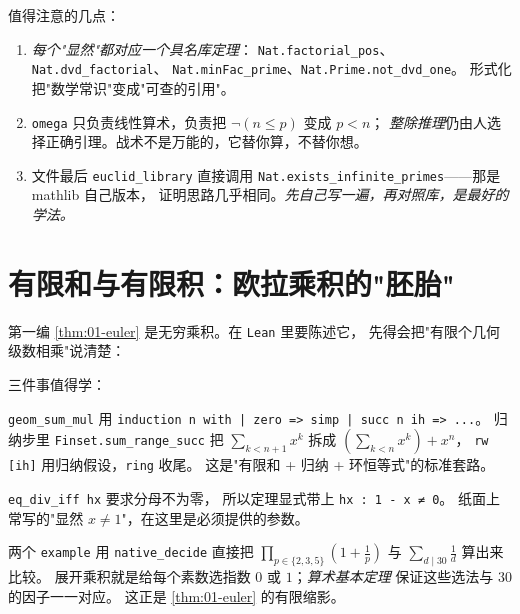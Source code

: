 值得注意的几点：

\begin{enumerate}[label=\arabic*.]
  \item \emph{每个"显然"都对应一个具名库定理}：
        \texttt{Nat.factorial\_pos}、\texttt{Nat.dvd\_factorial}、
        \texttt{Nat.minFac\_prime}、\texttt{Nat.Prime.not\_dvd\_one}。
        形式化把"数学常识"变成"可查的引用"。
  \item \texttt{omega} 只负责线性算术，负责把 $\neg(n\le p)$ 变成 $p<n$；
        \emph{整除推理}仍由人选择正确引理。战术不是万能的，它替你算，不替你想。
  \item 文件最后 \texttt{euclid\_library} 直接调用
        \texttt{Nat.exists\_infinite\_primes}——那是 mathlib 自己版本，
        证明思路几乎相同。\emph{先自己写一遍，再对照库，是最好的学法。}
\end{enumerate}

\section{有限和与有限积：欧拉乘积的"胚胎"}
\label{sec:07-eulerproduct}

第一编 \cref{thm:01-euler} 是无穷乘积。在 \texttt{Lean} 里要陈述它，
先得会把"有限个几何级数相乘"说清楚：


三件事值得学：

\begin{description}[leftmargin=2.2em]
  \item[\textbf{归纳}] \texttt{geom\_sum\_mul} 用
        \texttt{induction n with | zero => simp | succ n ih => ...}。
        归纳步里 \texttt{Finset.sum\_range\_succ} 把
        $\sum_{k<n+1}x^k$ 拆成 $\left(\sum_{k<n}x^k\right)+x^n$，
        \texttt{rw [ih]} 用归纳假设，\texttt{ring} 收尾。
        这是"有限和 + 归纳 + 环恒等式"的标准套路。
  \item[\textbf{除法条件}] \texttt{eq\_div\_iff hx} 要求分母不为零，
        所以定理显式带上 \texttt{hx : 1 - x ≠ 0}。
        纸面上常写的"显然 $x\ne1$"，在这里是必须提供的参数。
  \item[\textbf{计算验证}] 两个 \texttt{example} 用 \texttt{native\_decide}
        直接把 $\prod_{p\in\{2,3,5\}}\left(1+\frac1p\right)$
        与 $\sum_{d\mid 30}\frac1d$ 算出来比较。
        展开乘积就是给每个素数选指数 $0$ 或 $1$；\emph{算术基本定理}
        保证这些选法与 $30$ 的因子一一对应。
        这正是 \cref{thm:01-euler} 的有限缩影。
\end{description}

